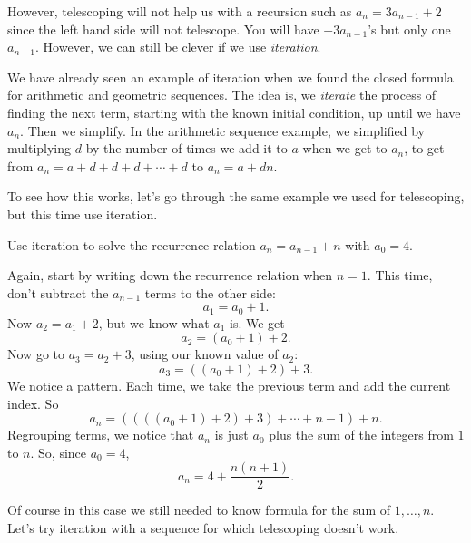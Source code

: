 \documentclass[12pt]{article}
\begin{document}
However, telescoping will not help us with a recursion such as $a_n = 3a_{n-1} + 2$ since the left hand side will not telescope.  You will have $-3a_{n-1}$'s but only one $a_{n-1}$.  However, we can still be clever if we use {\em iteration}.
%

We have already seen an example of iteration when we found the closed formula for arithmetic and geometric sequences.  The idea is, we {\em iterate} the process of finding the next term, starting with the known initial condition, up until we have $a_n$.  Then we simplify.  In the arithmetic sequence example, we simplified by multiplying $d$ by the number of times we add it to $a$ when we get to $a_n$, to get from $a_n = a + d + d + d + \cdots + d$ to $a_n = a + dn$.

To see how this works, let's go through the same example we used for telescoping, but this time use iteration.



\begin{example}
  Use iteration to solve the recurrence relation $a_n = a_{n-1} + n$ with $a_0 = 4$.
  
  \begin{solution}
    Again, start by writing down the recurrence relation when $n = 1$.  This time, don't subtract the $a_{n-1}$ terms to the other side:
    \[a_1 = a_0 + 1.\]
    Now $a_2 = a_1 + 2$, but we know what $a_1$ is.  We get
    \[a_2 = (a_0 + 1) + 2.\]
    Now go to $a_3 = a_2 + 3$, using our known value of $a_2$:
    \[a_3 = ((a_0 + 1) + 2) + 3.\]
    We notice a pattern.  Each time, we take the previous term and add the current index.  So
    \[a_n = ((((a_0 + 1) +2)+3)+\cdots + n-1) + n.\]
    Regrouping terms, we notice that $a_n$ is just $a_0$ plus the sum of the integers from $1$ to $n$.  So, since $a_0 = 4$, 
    \[a_n = 4 + \frac{n(n+1)}{2}.\]
  \end{solution}

\end{example}

 Of course in this case we still needed to know formula for the sum of $1,\ldots,n$.  Let's try iteration with a sequence for which telescoping doesn't work.
 
\end{document}
